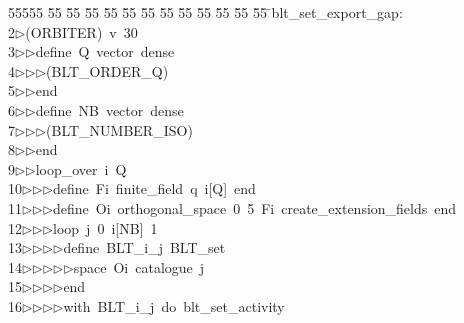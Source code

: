 %
%
\begin{tabbing}
55555 \= 55 \= 55 \= 55 \= 55 \= 55 \= 55 \= 55 \= 55 \= 55 \= 55 \= 55 \= 55 \= \>blt\_set\_export\_gap:\ \\[0pt]
2\>$\triangleright$\>(ORBITER)\ v\ 30\ \\[0pt]
3\>$\triangleright$\>$\triangleright$\>define\ Q\ vector\ dense\ \\[0pt]
4\>$\triangleright$\>$\triangleright$\>$\triangleright$\>(BLT\_ORDER\_Q)\ \\[0pt]
5\>$\triangleright$\>$\triangleright$\>end\ \\[0pt]
6\>$\triangleright$\>$\triangleright$\>define\ NB\ vector\ dense\ \\[0pt]
7\>$\triangleright$\>$\triangleright$\>$\triangleright$\>(BLT\_NUMBER\_ISO)\ \\[0pt]
8\>$\triangleright$\>$\triangleright$\>end\ \\[0pt]
9\>$\triangleright$\>$\triangleright$\>loop\_over\ i\ Q\ \\[0pt]
10\>$\triangleright$\>$\triangleright$\>$\triangleright$\>define\ Fi\ finite\_field\ q\ i[Q]\ end\ \\[0pt]
11\>$\triangleright$\>$\triangleright$\>$\triangleright$\>define\ Oi\ orthogonal\_space\ 0\ 5\ Fi\ create\_extension\_fields\ end\ \\[0pt]
12\>$\triangleright$\>$\triangleright$\>$\triangleright$\>loop\ j\ 0\ i[NB]\ 1\ \\[0pt]
13\>$\triangleright$\>$\triangleright$\>$\triangleright$\>$\triangleright$\>define\ BLT\_i\_j\ BLT\_set\ \\[0pt]
14\>$\triangleright$\>$\triangleright$\>$\triangleright$\>$\triangleright$\>$\triangleright$\>space\ Oi\ catalogue\ j\ \\[0pt]
15\>$\triangleright$\>$\triangleright$\>$\triangleright$\>$\triangleright$\>end\ \\[0pt]
16\>$\triangleright$\>$\triangleright$\>$\triangleright$\>$\triangleright$\>with\ BLT\_i\_j\ do\ blt\_set\_activity\ \\[0pt]

\end{tabbing}
